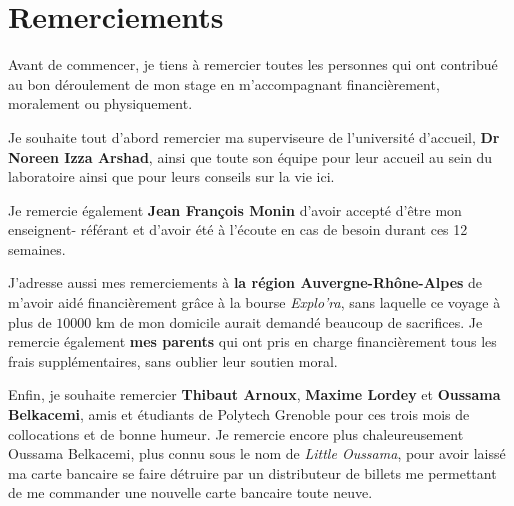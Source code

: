 \chapter*{Remerciements}

Avant de commencer, je tiens à remercier toutes les personnes qui ont contribué au bon déroulement de mon stage en m'accompagnant financièrement, moralement ou physiquement.

Je souhaite tout d'abord remercier ma superviseure de l'université d'accueil, \textbf{Dr Noreen Izza Arshad}, ainsi que toute son équipe pour leur accueil au sein du laboratoire ainsi que pour leurs conseils sur la vie ici.

Je remercie également \textbf{Jean François Monin} d'avoir accepté d'être mon enseignent- référant et d'avoir été à l'écoute en cas de besoin durant ces 12 semaines.

J'adresse aussi mes remerciements à \textbf{la région Auvergne-Rhône-Alpes} de m'avoir aidé financièrement grâce à la bourse \textit{Explo'ra}, sans laquelle ce voyage à plus de $10000$ km de mon domicile aurait demandé beaucoup de sacrifices. Je remercie également \textbf{mes parents} qui ont pris en charge financièrement tous les frais supplémentaires, sans oublier leur soutien moral.

Enfin, je souhaite remercier \textbf{Thibaut Arnoux}, \textbf{Maxime Lordey} et \textbf{Oussama Belkacemi}, amis et étudiants de Polytech Grenoble pour ces trois mois de collocations et de bonne humeur. Je remercie encore plus chaleureusement Oussama Belkacemi, plus connu sous le nom de \textit{Little Oussama}, pour avoir laissé ma carte bancaire se faire détruire par un distributeur de billets me permettant de me commander une nouvelle carte bancaire toute neuve.
